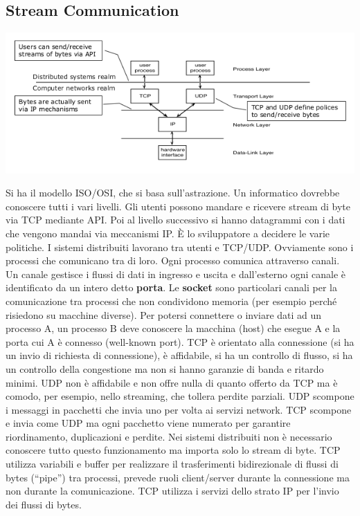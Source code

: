 \documentclass[a4paper,12pt, oneside]{book}
\begin{document}
\subsection{Stream Communication}
\begin{center}
	\includegraphics[scale=2.5]{img/sc.png}
\end{center}
Si ha il modello ISO/OSI, che si basa sull'astrazione. Un informatico dovrebbe conoscere tutti i vari livelli. Gli utenti possono mandare e ricevere stream di byte via TCP mediante API. Poi al livello successivo si hanno datagrammi con i dati che vengono mandai via meccanismi IP. È lo sviluppatore a decidere le varie politiche. I sistemi distribuiti lavorano tra utenti e TCP/UDP. Ovviamente sono i processi che comunicano tra di loro. Ogni processo comunica attraverso canali. Un canale gestisce i flussi di dati in ingresso e uscita e dall'esterno ogni canale è identificato da un intero detto \textbf{porta}. Le \textbf{socket} sono particolari canali per la comunicazione tra processi che non condividono memoria (per esempio perché risiedono su macchine diverse). Per potersi connettere o inviare dati ad un processo A, un processo B deve conoscere la macchina (host) che esegue A e la porta cui A è connesso (well-known port).   TCP è orientato alla connessione (si ha un invio di richiesta di connessione), è affidabile, si ha un controllo di flusso, si ha un controllo della congestione ma non si hanno garanzie di banda e ritardo minimi. UDP non è affidabile e non offre nulla di quanto offerto da TCP ma è comodo, per esempio, nello streaming, che tollera perdite parziali. UDP scompone i messaggi in pacchetti che invia uno per volta ai servizi network. TCP scompone e invia come UDP ma ogni pacchetto viene numerato per garantire riordinamento, duplicazioni e perdite. Nei sistemi distribuiti non è necessario conoscere tutto questo funzionamento ma importa solo lo stream di byte. TCP utilizza variabili e buffer per realizzare il trasferimenti bidirezionale di flussi di bytes (“pipe”) tra processi, prevede ruoli client/server durante la connessione ma non durante la comunicazione. TCP utilizza i servizi dello strato IP per l'invio dei flussi di bytes.\\
\end{document}
